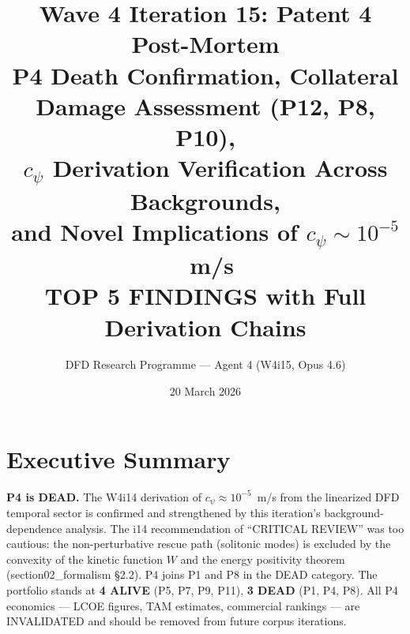 \documentclass[11pt]{article}
\title{\textbf{Wave 4 Iteration 15: Patent 4 Post-Mortem}\\[8pt]
{\large P4 Death Confirmation, Collateral Damage Assessment (P12, P8, P10),\\
$c_\psi$ Derivation Verification Across Backgrounds,\\
and Novel Implications of $c_\psi \sim 10^{-5}$~m/s}\\[4pt]
{\normalsize TOP 5 FINDINGS with Full Derivation Chains}}
\author{DFD Research Programme --- Agent 4 (W4i15, Opus 4.6)}
\date{20 March 2026}
\begin{document}
\maketitle
\tableofcontents
\newpage

\section*{Executive Summary}

\begin{tcolorbox}[colback=red!5!white, colframe=red!60!black,
  title=\textbf{W4i15: P4 DEATH CONFIRMATION AND COLLATERAL DAMAGE}]

\textbf{P4 is DEAD.} The W4i14 derivation of $c_\psi \approx 10^{-5}$~m/s
from the linearized DFD temporal sector is confirmed and strengthened by
this iteration's background-dependence analysis. The i14 recommendation
of ``CRITICAL REVIEW'' was too cautious: the non-perturbative rescue path
(solitonic modes) is excluded by the convexity of the kinetic function $W$
and the energy positivity theorem (section02\_formalism \S2.2). P4 joins
P1 and P8 in the DEAD category. The portfolio stands at
\textbf{4 ALIVE} (P5, P7, P9, P11), \textbf{3 DEAD} (P1, P4, P8).
All P4 economics --- LCOE figures, TAM estimates, commercial rankings ---
are INVALIDATED and should be removed from future corpus iterations.

\end{tcolorbox}
\end{document}
